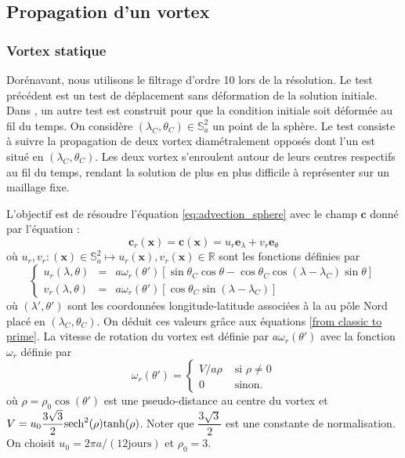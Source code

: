 \subsection{Propagation d'un vortex}

\subsubsection{Vortex statique}

Dorénavant, nous utilisons le filtrage d'ordre 10 lors de la résolution. Le test précédent est un test de déplacement sans déformation de la solution initiale. Dans \cite{Nair2002}, un autre test est construit pour que la condition initiale soit déformée au fil du temps.
On considère $(\lambda_C, \theta_C) \in \mathbb{S}_a^2$ un point de la sphère. Le test consiste à suivre la propagation de deux vortex diamétralement opposés dont l'un est situé en $(\lambda_C, \theta_C)$. Les deux vortex s'enroulent autour de leurs centres respectifs au fil du temps, rendant la solution de plus en plus difficile à représenter sur un maillage fixe.

L'objectif est de résoudre l'équation \eqref{eq:advection_sphere} avec le champ $\mathbf{c}$ donné par l'équation :
\begin{equation}
\mathbf{c}_r(\mathbf{x}) = \mathbf{c}(\mathbf{x}) = u_r \mathbf{e}_{\lambda} + v_r \mathbf{e}_{\theta}
\label{eq:rotation_vortex}
\end{equation}
où $u_r, v_r : (\mathbf{x}) \in \mathbb{S}_a^2 \mapsto u_r(\mathbf{x}), v_r(\mathbf{x}) \in \mathbb{R}$ sont les fonctions définies par
\begin{equation}
\left\lbrace
\begin{array}{rcl}
u_r(\lambda, \theta) & = & a \omega_r(\theta') \left[ \sin \theta_C \cos \theta - \cos \theta_C \cos (\lambda - \lambda_C) \sin \theta \right] \\
v_r(\lambda, \theta) & = & a \omega_r (\theta') \left[\cos \theta_C \sin (\lambda - \lambda_C)  \right]
\end{array}
\right.
\end{equation}
où $(\lambda', \theta')$ sont les coordonnées longitude-latitude associées à la au pôle Nord placé en $(\lambda_C, \theta_C)$. On déduit ces valeurs grâce aux équations \eqref{from classic to prime}.
La vitesse de rotation du vortex est définie par $a \omega_r(\theta')$ avec la fonction $\omega_r$ définie par
\begin{equation}
\omega_r(\theta') = \left\lbrace
\begin{array}{cl}
V/a\rho & \text{ si } \rho \neq 0 \\
0 & \text{ sinon.}
\end{array}
\right.
\end{equation}
où $\rho = \rho_0 \cos (\theta')$ est une pseudo-distance au centre du vortex et $V=u_0 \dfrac{3 \sqrt{3}}{2} \text{sech}^2 (\rho) \text{tanh} (\rho)$. Noter que $\dfrac{3 \sqrt{3}}{2}$ est une constante de normalisation. On choisit $u_0 = 2 \pi a / (12 \text{jours})$ et $\rho_0 = 3$.

